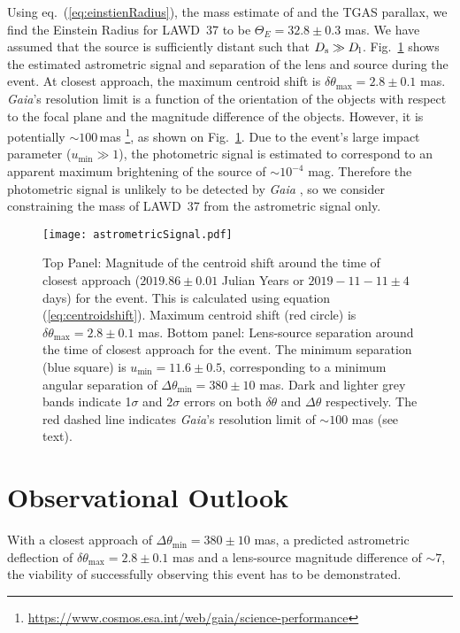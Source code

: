 \documentclass[fleqn,usenatbib]{mnras}
\newcommand{\Gaia}{{\it Gaia }}
\begin{document}
Using eq.~(\ref{eq:einstienRadius}), the mass estimate of \cite{Giammichele2012} and the TGAS parallax, we find the Einstein Radius for LAWD~37 to be $\Theta_{E}=32.8\pm0.3$ mas. We have assumed that the source is sufficiently distant such that $D_{\rm s}\gg D_{\rm l}$. Fig.~\ref{fig:astrometricSignal} shows the estimated astrometric signal and separation of the lens and source during the event. At closest approach, the maximum centroid shift is $\delta\theta_{\text{max}}=2.8\pm0.1$ mas. {\it Gaia}'s resolution limit is a function of the orientation of the objects with respect to the focal plane and the magnitude difference of the objects. However, it is potentially $\sim100$\,mas \footnote{\url{https://www.cosmos.esa.int/web/gaia/science-performance}}, as shown on Fig.~\ref{fig:astrometricSignal}. Due to the event's large impact parameter ($u_{\text{min}}\gg 1$), the photometric signal is estimated to correspond to an apparent maximum brightening of the source of $\sim 10^{-4}$ mag. Therefore the photometric signal is unlikely to be detected by \Gaia, so we consider constraining the mass of LAWD~37 from the astrometric signal only.

\begin{figure}
\texttt{[image: astrometricSignal.pdf]}
 \caption{Top Panel: Magnitude of the centroid shift around the time of closest approach ($2019.86\pm0.01$ Julian Years or $2019-11-11 \pm 4$ days) for the event. This is calculated using equation (\ref{eq:centroidshift}). Maximum centroid shift (red circle) is $\delta\theta_{\text{max}}=2.8\pm0.1$ mas. Bottom panel: Lens-source separation around the time of closest approach for the event. The minimum separation (blue square) is $u_{\text{min}}=11.6\pm0.5$, corresponding to a minimum angular separation of $\Delta\theta_{\text{min}} = 380\pm10$ mas. Dark and lighter grey bands indicate 1$\sigma$ and $2\sigma$ errors on both $\delta\theta$ and $\Delta\theta$ respectively. The red dashed line indicates {\it Gaia}'s resolution limit of $\sim100$ mas (see text).}
 \label{fig:astrometricSignal}
\end{figure}

\section{Observational Outlook}

With a closest approach of $\Delta\theta_{\text{min}} = 380\pm10$ mas, a predicted astrometric deflection of  $\delta\theta_{\text{max}}=2.8\pm0.1$ mas and a lens-source magnitude difference of $\sim 7$, the viability of successfully observing this event has to be demonstrated.
\end{document}
